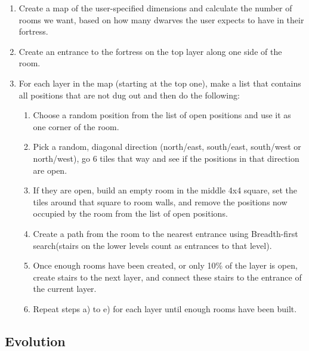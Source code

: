 \begin{enumerate}

	\item Create a map of the user-specified dimensions and calculate the number of rooms we want, based on how many dwarves the user expects to have in their fortress.

	\item Create an entrance to the fortress on the top layer along one side of the room.

	\item For each layer in the map (starting at the top one), make a list that contains all positions that are not dug out and then do the following:

	\begin{enumerate}
		
		\item Choose a random position from the list of open positions and use it as one corner of the room.

		\item Pick a random, diagonal direction (north/east, south/east, south/west or north/west), go 6 tiles that way and see if the positions in that direction are open.

		\item If they are open, build an empty room in the middle 4x4 square, set the tiles around that square to room walls, and remove the positions now occupied by the room from the list of open positions.

		\item Create a path from the room to the nearest entrance using Breadth-first search\cite{sedgewick4th}\cite{ucibfs}(stairs on the lower levels count as entrances to that level).

		\item Once enough rooms have been created, or only 10\% of the layer is open, create stairs to the next layer, and connect these stairs to the entrance of the current layer.

		\item Repeat steps a) to e) for each layer until enough rooms have been built.

	\end{enumerate}

\end{enumerate}

\subsection{Evolution}
\label{04_Evolution}

